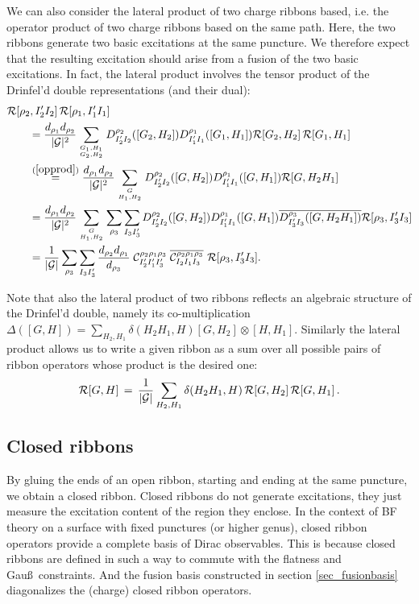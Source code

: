 \documentclass[nofootinbib,superscriptaddress,eqsecnum,tightenlines,11pt]{revtex4-1}
\def\nn{\nonumber}
\def\q{\qquad}
\def\mG{\mathcal{G}}
\def\ba{\begin{eqnarray}}
\def\ea{\end{eqnarray}}
\begin{document}
We can also consider the lateral product of two charge ribbons based, i.e. the operator product of two charge ribbons based on the same path. 
Here, the two ribbons generate two basic excitations at the same puncture. 
We therefore expect that the resulting excitation should arise from a fusion of the two basic excitations. 
In fact, the lateral product involves the tensor product of the Drinfel'd double representations (and their dual): 
\begin{align}\label{OpF} \nn
	&\mathcal{R}[\rho_2,I_2' I_2] \, \mathcal{R}[\rho_1,I_1' I_1] \\ \nn
	& \q  = \frac{{d_{\rho_1}d_{\rho_2}}}{|\mG|^2}\sum_{G_1,H_1 \atop G_2,H_2} D^{\rho_2}_{I_2' I_2}([G_2,H_2]) 
	D^{\rho_1}_{I_1' I_1}([G_1,H_1]) \mathcal{R}[G_2,H_2]\, \mathcal{R}[G_1,H_1] \\ \nn
	&\q \stackrel{ (\ref{opprod})}{=} \frac{{d_{\rho_1}d_{\rho_2}}}{|\mG|^2}\sum_{G\atop H_1,H_2} D^{\rho_2}_{I_2' I_2}([G,H_2])
	D^{\rho_1}_{I_1' I_1}([G,H_1]) \mathcal{R}[G,H_2H_1] \\ \nn
	& \q = \frac{{d_{\rho_1}d_{\rho_2}}}{|\mG|^2}\sum_{G\atop H_1,H_2}\sum_{\rho_3}\sum_{I_3 I_3'} D^{\rho_2}_{I_2' I_2}([G,H_2])
	D^{\rho_1}_{I_1' I_1}([G,H_1])\overline{D^{\rho_3}_{I_3' I_3}([G,H_2H_1])} \mathcal{R}[\rho_3,I_3' I_3] \\ 
	& \q =  \frac{ 1}{|\mG|}\sum_{\rho_3}\sum_{I_3 I_3'}\frac{d_{\rho_2}d_{\rho_1}}{d_{\rho_3}}\;
	{\mathcal{C}^{\rho_2 \rho_1 \rho_3}_{I_2' I_1' I_3'}}	\;
	\overline{\mathcal{C}^{\rho_2 \rho_1 \rho_3}_{I_2 I_1 I_3}} \,\, \mathcal{R}[\rho_3,I_3' I_3].
\end{align}


 Note that  also the lateral product of two ribbons reflects an algebraic structure of the Drinfel'd double, namely its co-multiplication  $\Delta([G,H]) = \sum_{H_2,H_1}\delta(H_2H_1,H) [G,H_2]\otimes[H,H_1]$.  Similarly the lateral product allows us to write a given ribbon as a sum over all possible pairs of ribbon operators whose product is the desired one:
 \ba
 {\cal R}[G, H] \,=\, \frac{1}{|{\cal G}|} \sum_{H_2,H_1} \delta(H_2H_1,H) \, {\cal R}[G,H_2] \,  {\cal R}[G,H_1]   \, .
 \ea




\subsection{Closed ribbons}

By gluing the ends of an open ribbon, starting and ending at the same puncture, we obtain a closed ribbon.
Closed ribbons do not generate excitations, they just measure the excitation content of the region they enclose.
In the context of BF theory on a surface with fixed punctures (or higher genus), closed ribbon operators provide a complete basis of Dirac observables.
This is because closed ribbons {are defined in such a way to} commute with the flatness and Gau\ss~constraints.
And the fusion basis constructed in section \ref{sec_fusionbasis} diagonalizes the (charge) closed ribbon operators. 
\end{document}
